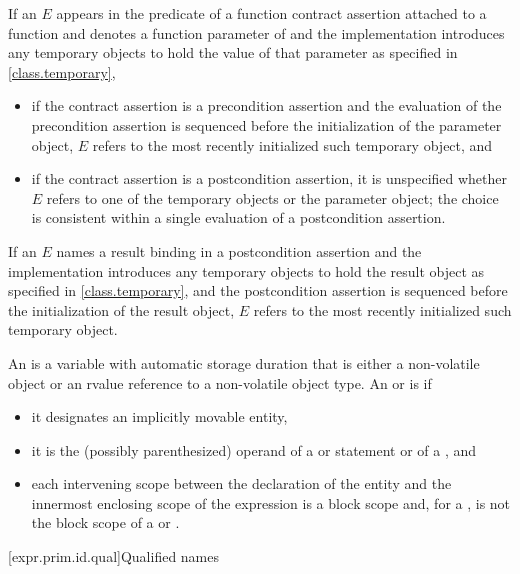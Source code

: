\pnum
If an  $E$
appears in the predicate of
a function contract assertion attached to a function 
and denotes
a function parameter of 
and the implementation introduces any temporary objects
to hold the value of that parameter as specified in \ref{class.temporary},
\begin{itemize}
\item
if the contract assertion
is a precondition assertion
and the evaluation of the precondition assertion
is sequenced before the initialization of the parameter object,
$E$ refers to the most recently initialized such temporary object, and
\item
if the contract assertion
is a postcondition assertion,
it is unspecified whether $E$ refers to
one of the temporary objects or the parameter object;
the choice is consistent within a single evaluation of a postcondition assertion.
\end{itemize}

\pnum
If an  $E$
names a result binding
in a postcondition assertion
and the implementation introduces any temporary objects
to hold the result object as specified in \ref{class.temporary},
and the postcondition assertion
is sequenced before the initialization of the result object,
$E$ refers to the most recently initialized such temporary object.

\pnum
An  is
a variable with automatic storage duration
that is either a non-volatile object or
an rvalue reference to a non-volatile object type.
An  or
is  if
\begin{itemize}
\item
it designates an implicitly movable entity,
\item
it is the (possibly parenthesized)
operand of a  or
 statement or
of a , and
\item
each intervening scope between
the declaration of the entity and
the innermost enclosing scope of the expression
is a block scope and,
for a ,
is not the block scope of
a  or .
\end{itemize}

[expr.prim.id.qual]{Qualified names}

